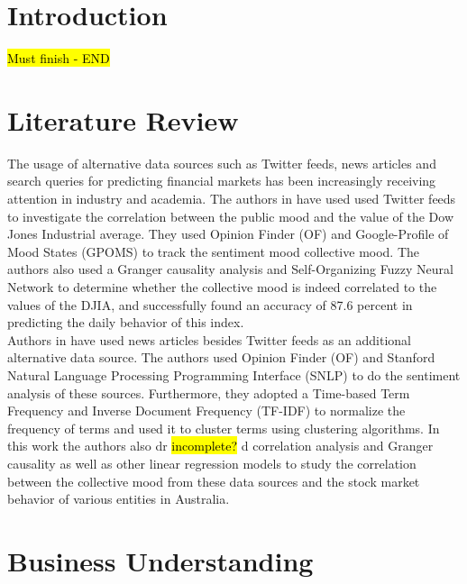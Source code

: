 \documentclass[sigconf, nonacm]{acmart}
\begin{document}
\section{Introduction}
\hl{Must finish - END}

\section{Literature Review}
The usage of alternative data sources such as Twitter feeds, news articles and search queries for predicting financial markets has been increasingly receiving attention in industry and academia. The authors in \cite{DBLP:journals/corr/abs-1010-3003} have used used Twitter feeds to investigate the correlation between the public mood and the value of the Dow Jones Industrial average. They used Opinion Finder (OF) and Google-Profile of Mood States (GPOMS) to track the sentiment mood collective mood. The authors also used a Granger causality analysis and Self-Organizing Fuzzy Neural Network to determine whether the collective mood is indeed correlated to the values of the DJIA, and successfully found an accuracy of 87.6 percent in predicting the daily behavior  of this index. \\
Authors in \cite{8713246} have used news articles besides Twitter feeds as an additional alternative data source. The authors used Opinion Finder (OF) and Stanford Natural Language Processing Programming Interface (SNLP) to do the sentiment analysis of these sources. Furthermore, they adopted a  Time-based Term Frequency and Inverse Document Frequency (TF-IDF) to  normalize the frequency of terms and used it to cluster terms using clustering algorithms. In this work the authors also dr \hl{incomplete?}
d correlation analysis and Granger causality as well as other linear regression models to study the correlation between the collective mood from these data sources and the stock market behavior of various entities in Australia. 

\section{Business Understanding}
\end{document}

